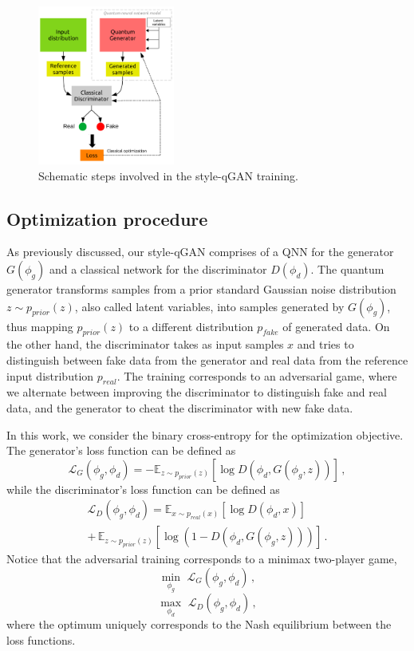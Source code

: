 \documentclass[twocolumn,preprintnumbers,superscriptaddress]{revtex4-2}
\begin{document}
\begin{figure}
  \includegraphics[width=0.4\textwidth]{plots/scheme2.pdf}
  \caption{\label{fig:scheme} Schematic steps involved in the style-qGAN training.}
\end{figure}

\subsection{Optimization procedure}

As previously discussed, our style-qGAN comprises of a QNN for the generator $G(\phi_g)$ and a classical network for the discriminator $D(\phi_d)$. The quantum generator transforms samples from a prior standard Gaussian noise distribution $z \sim p_{prior}(z)$, also called latent variables, into samples generated by $G(\phi_g)$, thus mapping $p_{prior}(z)$ to a different distribution $p_{fake}$ of generated data. On the other hand, the discriminator takes as input samples $x$ and tries to distinguish between fake data from the generator and real data from the reference input distribution $p_{real}$. The training corresponds to an adversarial game, where we alternate between improving the discriminator to distinguish fake and real data, and the generator to cheat the discriminator with new fake data.

In this work, we consider the binary cross-entropy for the optimization objective. The generator's loss function can be defined as
\begin{equation}
  \mathcal{L}_G(\phi_g,\phi_d) = -\mathbb{E}_{z \sim p_{prior}(z)}[\log D(\phi_d,G(\phi_g,z))]  \,,
\end{equation}
while the discriminator's loss function can be defined as
\begin{equation}
\begin{split}
  \mathcal{L}_D(\phi_g,\phi_d) = \mathbb{E}_{x \sim p_{real}(x)}[\log D(\phi_d,x)] \\+\, \mathbb{E}_{z \sim p_{prior}(z)}[\log (1-D(\phi_d,G(\phi_g,z)))]\,.
\end{split}
\end{equation}
Notice that the adversarial training corresponds to a minimax two-player game,
\begin{equation}
 \underset{\phi_g}{\min}\,\,\mathcal{L}_G(\phi_g,\phi_d)  \,,
\end{equation}
\begin{equation}
 \underset{\phi_d}{\max}\,\,\mathcal{L}_D(\phi_g,\phi_d)  \,,
\end{equation}
where the optimum uniquely corresponds to the Nash equilibrium between the loss functions.
\end{document}
